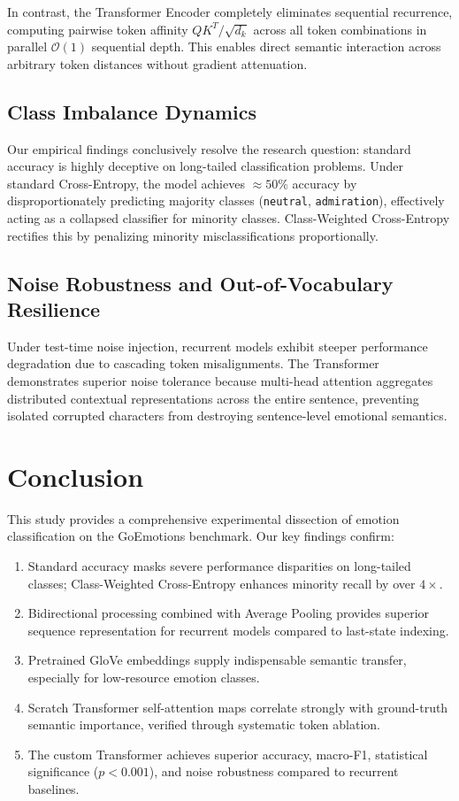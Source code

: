 \documentclass[10pt,twocolumn,letterpaper]{article}
\begin{document}
In contrast, the Transformer Encoder completely eliminates sequential recurrence, computing pairwise token affinity $QK^T/\sqrt{d_k}$ across all token combinations in parallel $\mathcal{O}(1)$ sequential depth. This enables direct semantic interaction across arbitrary token distances without gradient attenuation.

\subsection{Class Imbalance Dynamics}
Our empirical findings conclusively resolve the research question: standard accuracy is highly deceptive on long-tailed classification problems. Under standard Cross-Entropy, the model achieves $\approx 50\%$ accuracy by disproportionately predicting majority classes (\texttt{neutral}, \texttt{admiration}), effectively acting as a collapsed classifier for minority classes. Class-Weighted Cross-Entropy rectifies this by penalizing minority misclassifications proportionally.

\subsection{Noise Robustness and Out-of-Vocabulary Resilience}
Under test-time noise injection, recurrent models exhibit steeper performance degradation due to cascading token misalignments. The Transformer demonstrates superior noise tolerance because multi-head attention aggregates distributed contextual representations across the entire sentence, preventing isolated corrupted characters from destroying sentence-level emotional semantics.

\section{Conclusion}
This study provides a comprehensive experimental dissection of emotion classification on the GoEmotions benchmark. Our key findings confirm:
\begin{enumerate}
    \item Standard accuracy masks severe performance disparities on long-tailed classes; Class-Weighted Cross-Entropy enhances minority recall by over $4\times$.
    \item Bidirectional processing combined with Average Pooling provides superior sequence representation for recurrent models compared to last-state indexing.
    \item Pretrained GloVe embeddings supply indispensable semantic transfer, especially for low-resource emotion classes.
    \item Scratch Transformer self-attention maps correlate strongly with ground-truth semantic importance, verified through systematic token ablation.
    \item The custom Transformer achieves superior accuracy, macro-F1, statistical significance ($p < 0.001$), and noise robustness compared to recurrent baselines.
\end{enumerate}
\end{document}
